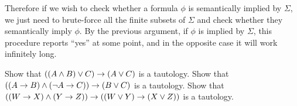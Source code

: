 Therefore if we wish to check whether a formula $\phi$ is semantically implied
by $\Sigma$, we just need to brute-force all the finite subsets of $\Sigma$ and
check whether they semantically imply $\phi$. By the previous argument, if
$\phi$ is implied by $\Sigma$, this procedure reports ``yes'' at some point,
and in the opposite case it will work infinitely long.

\begin{chapterendexercises}
  \exercise Show that $((A \land B) \lor C) \rightarrow (A \lor C)$ is a
    tautology.
  \exercise Show that $((A \rightarrow B) \land (\lnot A \rightarrow C)) \rightarrow
    (B \lor C)$ is a tautology.
  \exercise Show that 
    $((W \rightarrow X) \land (Y \rightarrow Z)) \rightarrow 
      ((W \lor Y) \rightarrow (X \lor Z))$
     is a tautology.
\end{chapterendexercises}
